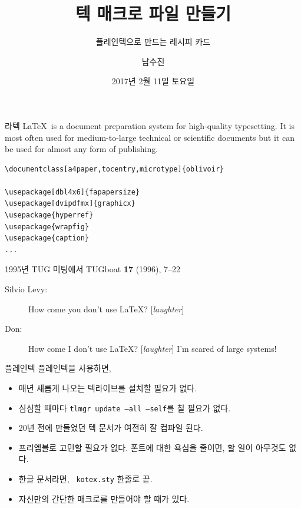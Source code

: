 \documentclass{beamer}
\title{텍 매크로 파일 만들기}
\subtitle{플레인텍으로 만드는 레시피 카드}
\date{2017년 2월 11일 토요일}
\author{남수진}
\institute{
  2017 한국텍학회 학술대회 및 정기총회 \\
  동국대학교 법학관 B253호}
\begin{document}
\maketitle

%
\begin{frame}[fragile]{라텍}
  \LaTeX\ is a document preparation system for high-quality typesetting.
  It is most often used for \alert{medium-to-large technical or scientific
    documents} {\scriptsize but it can be used for almost any form of
    publishing.}

{\small
  \begin{Verbatim}[fontsize=\small]
\documentclass[a4paper,tocentry,microtype]{oblivoir}

\usepackage[dbl4x6]{fapapersize}
\usepackage[dvipdfmx]{graphicx}
\usepackage{hyperref}
\usepackage{wrapfig}
\usepackage{caption}
...
  \end{Verbatim}
}
\end{frame}


%
\begin{frame}{1995년 TUG 미팅에서}
  TUGboat \textbf{17} (1996), 7--22
  \begin{description}
  \item[Silvio Levy:] How come you don't use \LaTeX? [\textsl{laughter}]
  \item[Don:] How come I don't use \LaTeX? [\textsl{laughter}]
    I'm scared of \alert{large systems!}
  \end{description}
\end{frame}


%
\begin{frame}{플레인텍}
  플레인텍을 사용하면,
  \begin{itemize}
  \item 매년 새롭게 나오는 텍라이브를 설치할 필요가 없다.
  \item 심심할 때마다 {\small \alert{\texttt{tlmgr update --all --self}}}를
    칠 필요가 없다.
  \item 20년 전에 만들었던 텍 문서가 여전히 잘 컴파일 된다.
  \item 프리엠블로 고민할 필요가 없다. 폰트에 대한 욕심을 줄이면, 할 일이 아무것도 없다.
  \item 한글 문서라면, {\small\alert{\texttt{\string\ kotex.sty}}}
    한줄로 끝.
  \item {\scriptsize 자신만의 간단한 매크로를 만들어야 할 때가 있다.}
  \end{itemize}
\end{frame}
\end{document}
